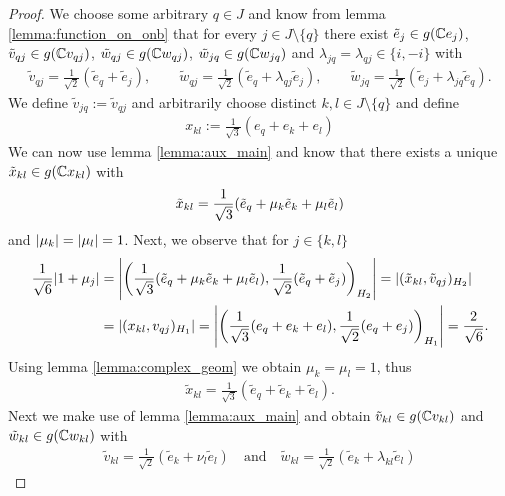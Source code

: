 \begin{proof}
	We choose some arbitrary $q \in J$ and know from lemma \ref{lemma:function_on_onb} that for every $j \in J \setminus \{q\}$ there exist $\tilde{e}_j \in g(\mathbb{C} e_j)$, $\tilde{v}_{qj} \in g(\mathbb{C} v_{qj})$, $\tilde{w}_{qj} \in g(\mathbb{C} w_{qj})$, $\tilde{w}_{jq} \in g(\mathbb{C} w_{jq})$ and $\lambda_{jq} = \lambda_{qj} \in \{i, -i\}$ with
	\begin{align*}
	\tilde{v}_{qj} = \frac{1}{\sqrt{2}}(\tilde{e}_q + \tilde{e}_j), \qquad \tilde{w}_{qj} = \frac{1}{\sqrt{2}}(\tilde{e}_q + \lambda_{qj}\tilde{e}_j), \qquad \tilde{w}_{jq} = \frac{1}{\sqrt{2}}(\tilde{e}_j + \lambda_{jq} \tilde{e}_q).
	\end{align*} 
	We define $\tilde{v}_{jq} := \tilde{v}_{qj}$ and arbitrarily choose distinct $k,l \in J \setminus \{q\}$ and define
	\begin{align*}
	x_{kl} := \frac{1}{\sqrt{3}}(e_q + e_k + e_l) 
	\end{align*} 
	We can now use lemma \ref{lemma:aux_main} and know that there exists a unique $\tilde{x}_{kl} \in g(\mathbb{C} x_{kl})$ with 
	\begin{align*}
	\tilde{x}_{kl} = \frac{1}{\sqrt{3}} {\left ( \tilde{e}_q + \mu_{k} \tilde{e}_k + \mu_{l} \tilde{e}_l \right )} 
	\end{align*}
	and ${\left | \mu_k \right |} = {\left | \mu_l \right |} = 1$. Next, we observe that for $j \in \{k,l\}$
	\begin{align*}
	\frac{1}{\sqrt{6}} {\left | 1 + \mu_j \right |} &= {\left | {\left ( \frac{1}{\sqrt{3}} {\left ( \tilde{e}_q + \mu_k \tilde{e}_k + \mu_l \tilde{e}_l \right )}, \frac{1}{\sqrt{2}} {\left ( \tilde{e}_q + \tilde{e}_j \right )} \right )}_{H_2} \right |} = |(\tilde{x}_{kl}, \tilde{v}_{qj})_{H_2}| \\
	&= |(x_{kl}, v_{qj})_{H_1}| = {\left | {\left ( \frac{1}{\sqrt{3}} {\left ( e_q + e_k + e_l \right )}, \frac{1}{\sqrt{2}} (e_q + e_j) \right )}_{H_1} \right |} = \frac{2}{\sqrt{6}}.
	\end{align*}
	Using lemma \ref{lemma:complex_geom} we obtain $\mu_k = \mu_l = 1$, thus
	\begin{align*}
	\tilde{x}_{kl} = \frac{1}{\sqrt{3}}(\tilde{e}_q + \tilde{e}_k + \tilde{e}_l).
	\end{align*}
	Next we make use of lemma \ref{lemma:aux_main} and obtain $\tilde{v}_{kl} \in g(\mathbb{C} v_{kl})$ and $\tilde{w}_{kl} \in g(\mathbb{C} w_{kl})$ with
	\begin{align*}
	\tilde{v}_{kl} = \frac{1}{\sqrt{2}}(\tilde{e}_k + \nu_l \tilde{e}_l) \quad \text{and} \quad \tilde{w}_{kl} = \frac{1}{\sqrt{2}}(\tilde{e}_k + \lambda_{kl} \tilde{e}_l)
	\end{align*}

\end{proof}
